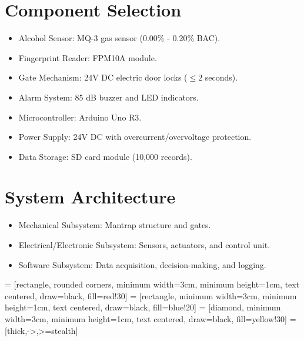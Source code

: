 \documentclass[12pt]{article}
\begin{document}
    \section{Component Selection}
    \label{sec:component_selection}
    \begin{itemize}
        \item Alcohol Sensor: MQ-3 gas sensor (0.00\% - 0.20\% BAC).
        \item Fingerprint Reader: FPM10A module.
        \item Gate Mechanism: 24V DC electric door locks ($\leq 2$ seconds).
        \item Alarm System: 85 dB buzzer and LED indicators.
        \item Microcontroller: Arduino Uno R3.
        \item Power Supply: 24V DC with overcurrent/overvoltage protection.
        \item Data Storage: SD card module (10,000 records).
    \end{itemize}

    \section{System Architecture}
    \label{sec:system_architecture}
    \begin{itemize}
        \item Mechanical Subsystem: Mantrap structure and gates.
        \item Electrical/Electronic Subsystem: Sensors, actuators, and control unit.
        \item Software Subsystem: Data acquisition, decision-making, and logging.
    \end{itemize}

 = [rectangle, rounded corners, minimum width=3cm, minimum height=1cm, text centered, draw=black, fill=red!30]
 = [rectangle, minimum width=3cm, minimum height=1cm, text centered, draw=black, fill=blue!20]
 = [diamond, minimum width=3cm, minimum height=1cm, text centered, draw=black, fill=yellow!30]
 = [thick,->,>=stealth]
\end{document}
